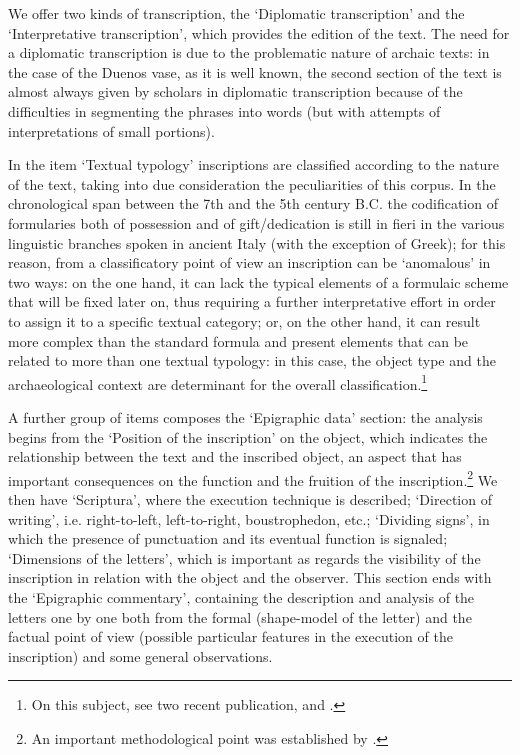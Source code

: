 \documentclass[amsthm,ebook]{saparticle}
\begin{document}
We offer two kinds of transcription, the ‘Diplomatic transcription' and the ‘Interpretative transcription', which
provides the edition of the text. The need for a diplomatic transcription is due to the problematic nature of archaic
texts: in the case of the Duenos vase, as it is well known, the second section of the text is almost always given by
scholars in diplomatic transcription because of the difficulties in segmenting the phrases into words (but with
attempts of interpretations of small portions). 

In the item `Textual typology' inscriptions are classified according to the nature of the text, taking into due
consideration the peculiarities of this corpus. In the chronological span between the 7th and the 5th century B.C. the
codification of formularies both of possession and of gift/dedication is still in fieri in the various linguistic
branches spoken in ancient Italy (with the exception of Greek); for this reason, from a classificatory point of view an
inscription can be ‘anomalous' in two ways: on the one hand, it can lack the typical elements of a formulaic scheme
that will be fixed later on, thus requiring a further interpretative effort in order to assign it to a specific textual
category; or, on the other hand, it can result more complex than the standard formula and present elements that can be
related to more than one textual typology: in this case, the object type and the archaeological context are determinant
for the overall classification.\footnote{On this subject, see two recent publication, \citet{poccetti_paradigmi_2009} and \citet{maras_storie_2015}.} 

A further group of items composes the ‘Epigraphic data' section: the analysis begins from the ‘Position of the
inscription' on the object, which indicates the relationship between the text and the inscribed object, an aspect that
has important consequences on the function and the fruition of the inscription.\footnote{An important methodological
point was established by \citet{susini_epigrafia_1982}.} We then have ‘Scriptura', where the execution technique is described;
‘Direction of writing', i.e. right-to-left, left-to-right, boustrophedon, etc.; ‘Dividing signs', in which the presence
of punctuation and its eventual function is signaled; ‘Dimensions of the letters', which is important as regards the
visibility of the inscription in relation with the object and the observer. This section ends with the ‘Epigraphic
commentary', containing the description and analysis of the letters one by one both from the formal (shape-model of the
letter) and the factual point of view (possible particular features in the execution of the inscription) and some
general observations.
\end{document}
